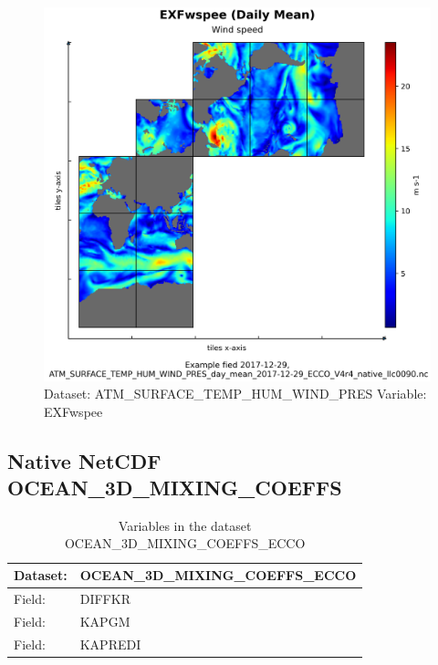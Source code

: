 \begin{figure}[H]
\centering
\includegraphics[scale=0.55]{../images/plots/native_plots/Atmosphere_Surface_Temperature_Humidity_Wind_and_Pressure/EXFwspee.png}
\caption{Dataset: ATM\_SURFACE\_TEMP\_HUM\_WIND\_PRES Variable: EXFwspee}
\label{tab:table-ATM_SURFACE_TEMP_HUM_WIND_PRES_EXFwspee-Plot}
\end{figure}
\pagebreak
\subsection{Native NetCDF OCEAN\_3D\_MIXING\_COEFFS}
\newp
\begin{longtable}{|p{}|p{}|}
\caption{Variables in the dataset OCEAN\_3D\_MIXING\_COEFFS\_ECCO}
\label{tab:table-OCEAN_3D_MIXING_COEFFS_ECCO-fields} \\ 
\hline \endhead \hline \endfoot
\rowcolor{lightgray} \textbf{Dataset:} & \textbf{OCEAN\_3D\_MIXING\_COEFFS\_ECCO} \\ \hline
Field: &DIFFKR \\ \hline
Field: &KAPGM \\ \hline
Field: &KAPREDI \\ \hline
\end{longtable}

\pagebreak
